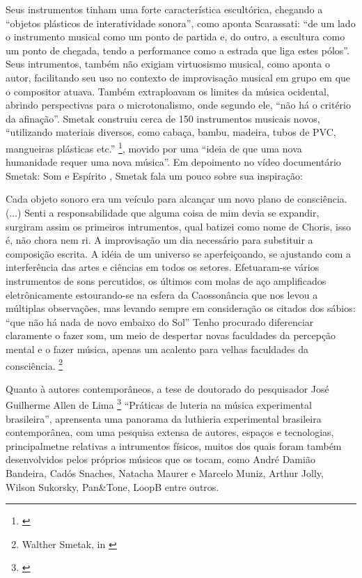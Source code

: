 Seus instrumentos tinham uma forte característica escultórica, chegando a ``objetos plásticos de interatividade sonora'', como aponta Scarassati: ``de um lado o instrumento musical como um ponto de partida e, do outro, a escultura como um ponto de chegada, tendo a performance como a estrada que liga estes pólos''. Seus intrumentos, também não exigiam virtuosismo musical, como aponta o autor, facilitando seu uso no contexto de improvisação musical em grupo em que o compositor atuava. Também extraploavam os limites da música ocidental, abrindo perspectivas para o microtonalismo, onde segundo ele, ``não há o critério da afinação''. Smetak construiu cerca de 150 instrumentos musicais novos, ``utilizando materiais diversos, como cabaça, bambu, madeira, tubos de PVC, mangueiras plásticas etc.'' \footnote{\cite{Andres2011}}, movido por uma ``ideia de que uma nova humanidade requer uma nova música''. Em depoimento no vídeo documentário Smetak: Som e Espírito \citeyear{JessicaSmetakPaoli2010}, Smetak fala um pouco sobre sua inspiração:


\begin{citacao}
Cada objeto sonoro era um veículo para alcançar um novo plano de consciência. (...) Senti a responsabilidade que alguma coisa de mim devia se expandir, surgiram assim os primeiros intrumentos, qual batizei como nome de Choris, isso é, não chora nem ri. A improvisação um dia necessário para substituir a composição escrita. A idéia de um universo se aperfeiçoando, se ajustando com a interferência das artes e ciências em todos os setores. Efetuaram-se vários instrumentos de sons percutidos, os últimos com molas de aço amplificados eletrônicamente estourando-se na esfera da Caossonância que nos levou a múltiplas observações, mas levando sempre em consideração os citados dos sábios: ``que não há nada de novo embaixo do Sol''
Tenho procurado diferenciar claramente o fazer som, um meio de despertar novas faculdades da percepção mental e o fazer música, apenas um acalento para velhas faculdades da consciência. \footnote{Walther Smetak, in \cite{JessicaSmetakPaoli2010}}
\end{citacao}

Quanto à autores contemporâneos, a tese de doutorado do pesquisador José Guilherme Allen de Lima \footnote{\cite{Lima2018}} ``Práticas de luteria na música experimental brasileira'', aprensenta uma panorama da luthieria experimental brasileira contemporânea, com uma pesquisa extensa de autores, espaços e tecnologias, principalmetne relativas a intrumentos físicos, muitos dos quais foram também desenvolvidos pelos próprios músicos que os tocam, como André Damião Bandeira, Cadós Snaches, Natacha Maurer e Marcelo Muniz, Arthur Jolly, Wilson Sukorsky, Pan\&Tone, LoopB entre outros.


